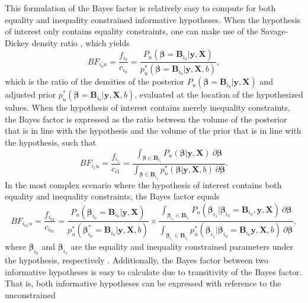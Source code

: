 \documentclass[
]{article}
\begin{document}
This formulation of the Bayes factor is relatively easy to compute for
both equality and inequality constrained informative hypotheses. When
the hypothesis of interest only contains equality constraints, one can
make use of the Savage-Dickey density ratio \citep{savage_dickey_1971},
which yields \[
BF_{i_0u} = \frac{f_{i_0}}{c_{i_0}} = \frac{
  P_u(\boldsymbol{\beta} = \boldsymbol{B}_{i_0} | \boldsymbol{y}, \boldsymbol{X})
}{
  p_u^*(\boldsymbol{\beta} = \boldsymbol{B}_{i_0} | \boldsymbol{y}, \boldsymbol{X}, b)
},
\] which is the ratio of the densities of the posterior
\(P_u(\boldsymbol{\beta} = \boldsymbol{B}_{i_0} | \boldsymbol{y}, \boldsymbol{X})\)
and adjusted prior
\(p^*_u(\boldsymbol{\beta} = \boldsymbol{B}_{i_0} | \boldsymbol{y}, \boldsymbol{X}, b)\),
evaluated at the location of the hypothesized values. When the
hypothesis of interest contains merely inequality constraints, the Bayes
factor is expressed as the ratio between the volume of the posterior
that is in line with the hypothesis and the volume of the prior that is
in line with the hypothesis, such that \[
BF_{i_1u} = \frac{f_{i_1}}{c_{i1}} = 
\frac{
  \int_{\boldsymbol{\beta} \in \boldsymbol{B}_{i_1}} P_u(\boldsymbol{\beta} | \boldsymbol{y}, \boldsymbol{X}) ~ \partial \boldsymbol{\beta}
}{
  \int_{\boldsymbol{\beta} \in \boldsymbol{B}_{i_1}} p_u^*(\boldsymbol{\beta} | \boldsymbol{y}, \boldsymbol{X}, b) ~ \partial \boldsymbol{\beta}
}.
\] In the most complex scenario where the hypothesis of interest
contains both equality and inequality constraints, the Bayes factor
equals \[
BF_{i_{01}u} = \frac{f_{i_{01}}}{c_{i_{01}}} = \frac{
  P_u(\boldsymbol{\beta}_{i_0} = \boldsymbol{B}_{i_0} | \boldsymbol{y}, \boldsymbol{X})
}{
  p^*_u(\boldsymbol{\beta}^*_{i_0} = \boldsymbol{B}_{i_0} | \boldsymbol{y}, \boldsymbol{X}, b)
} \times
\frac{
  \int_{\boldsymbol{\beta}_{i_1} \in \boldsymbol{B}_{i_1}} P_u(\boldsymbol{\beta}_{i_1} | \boldsymbol{\beta}_{i_0} = \boldsymbol{B}_{i_0}, \boldsymbol{y}, \boldsymbol{X}) ~ \partial \boldsymbol{\beta}
}{
  \int_{\boldsymbol{\beta}_{i_1} \in \boldsymbol{B}_{i_1}} p^*_u(\boldsymbol{\beta}_{i_1} | \boldsymbol{\beta}_{i_0} = \boldsymbol{B}_{i_0} \boldsymbol{y}, \boldsymbol{X}, b) ~ \partial \boldsymbol{\beta}
},
\] where \(\boldsymbol{\beta}_{i_0}\) and \(\boldsymbol{\beta}_{i_1}\)
are the equality and inequality constrained parameters under the
hypothesis, respectively \citep{gu_approximated_2018}. Additionally, the
Bayes factor between two informative hypotheses is easy to calculate due
to transitivity of the Bayes factor. That is, both informative
hypotheses can be expressed with reference to the unconstrained
\end{document}
